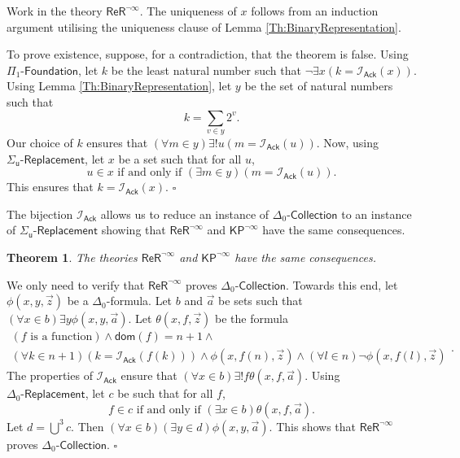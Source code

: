 \documentclass[11pt, a4paper]{article}
\newcounter{Theor1}
\newtheorem{theorem}{Theorem}[section]
\newenvironment{proof}[1][Proof]{\begin{trivlist}
\item[\hskip \labelsep {\bfseries #1}]}{\end{trivlist}}
\begin{document}
\begin{proof}
Work in the theory $\mathsf{ReR}^{\neg \infty}$. The uniqueness of $x$ follows from an induction argument utilising the uniqueness clause of Lemma \ref{Th:BinaryRepresentation}. 

To prove existence, suppose, for a contradiction, that the theorem is false. Using $\Pi_1\textsf{-Foundation}$, let $k$ be the least natural number such that $\neg \exists x (k= \mathcal{I}_{\mathsf{Ack}}(x))$. Using Lemma \ref{Th:BinaryRepresentation}, let $y$ be the set of natural numbers such that 
\[
k= \sum_{v \in y} 2^v.
\]
Our choice of $k$ ensures that $(\forall m \in y)\exists! u (m= \mathcal{I}_{\mathsf{Ack}}(u))$. Now, using $\Sigma_{\mathsf{u}}\textsf{-Replacement}$, let $x$ be a set such that for all $u$,
\[
u \in x \textrm{ if and only if } (\exists m \in y)(m= \mathcal{I}_{\mathsf{Ack}}(u)).
\]
This ensures that $k= \mathcal{I}_{\mathsf{Ack}}(x)$. \hfill$\square$   
\end{proof}

The bijection $\mathcal{I}_{\mathsf{Ack}}$ allows us to reduce an instance of $\Delta_0\textsf{-Collection}$ to an instance of $\Sigma_{\mathsf{u}}\textsf{-Replacement}$ showing that $\mathsf{ReR}^{\neg \infty}$ and $\mathsf{KP}^{\neg \infty}$ have the same consequences.

\begin{theorem} \label{Th:SameTheoryOfFiniteSets}
The theories $\mathsf{ReR}^{\neg \infty}$ and $\mathsf{KP}^{\neg \infty}$ have the same consequences.
\end{theorem}

\begin{proof}
We only need to verify that $\mathsf{ReR}^{\neg \infty}$ proves $\Delta_0\textsf{-Collection}$. Towards this end, 
let $\phi(x, y, \vec{z})$ be a $\Delta_0$-formula. Let $b$ and $\vec{a}$ be sets such that $(\forall x \in b) \exists y \phi(x, y, \vec{a})$. Let $\theta(x, f, \vec{z})$ be the formula
\[
\begin{array}{c}
(f \textrm{ is a function}) \land \mathsf{dom}(f)= n+1 \land\\
(\forall k \in n+1)(k= \mathcal{I}_{\mathsf{Ack}}(f(k))) \land \phi(x, f(n), \vec{z}) \land (\forall l \in n) \neg \phi(x, f(l), \vec{z}) 
\end{array}.
\]
The properties of $\mathcal{I}_{\mathsf{Ack}}$ ensure that $(\forall x \in b) \exists! f \theta(x, f, \vec{a})$. Using $\Delta_0\textsf{-Replacement}$, let $c$ be such that for all $f$,
\[
f \in c \textrm{ if and only if } (\exists x \in b) \theta(x, f, \vec{a}).
\]
Let $d= \bigcup^3 c$. Then $(\forall x \in b) (\exists y \in d) \phi(x, y, \vec{a})$. This shows that $\mathsf{ReR}^{\neg \infty}$ proves $\Delta_0\textsf{-Collection}$. \hfill$\square$   
\end{proof}
\end{document}
